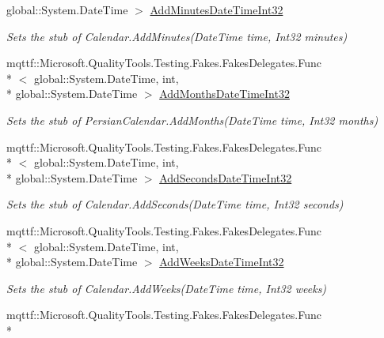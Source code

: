 \begin{DoxyCompactItemize}
global\-::\-System.\-Date\-Time $>$ \hyperlink{class_system_1_1_globalization_1_1_fakes_1_1_stub_persian_calendar_a5323dc095cebdc40f42385ff7452e242}{Add\-Minutes\-Date\-Time\-Int32}
\begin{DoxyCompactList}\small\item\em Sets the stub of Calendar.\-Add\-Minutes(\-Date\-Time time, Int32 minutes)\end{DoxyCompactList}\item 
mqttf\-::\-Microsoft.\-Quality\-Tools.\-Testing.\-Fakes.\-Fakes\-Delegates.\-Func\\*
$<$ global\-::\-System.\-Date\-Time, int, \\*
global\-::\-System.\-Date\-Time $>$ \hyperlink{class_system_1_1_globalization_1_1_fakes_1_1_stub_persian_calendar_acc43f2b67afd5dc328309eb2699e0e39}{Add\-Months\-Date\-Time\-Int32}
\begin{DoxyCompactList}\small\item\em Sets the stub of Persian\-Calendar.\-Add\-Months(\-Date\-Time time, Int32 months)\end{DoxyCompactList}\item 
mqttf\-::\-Microsoft.\-Quality\-Tools.\-Testing.\-Fakes.\-Fakes\-Delegates.\-Func\\*
$<$ global\-::\-System.\-Date\-Time, int, \\*
global\-::\-System.\-Date\-Time $>$ \hyperlink{class_system_1_1_globalization_1_1_fakes_1_1_stub_persian_calendar_a0bed1c188748a8c81928d253deb8658c}{Add\-Seconds\-Date\-Time\-Int32}
\begin{DoxyCompactList}\small\item\em Sets the stub of Calendar.\-Add\-Seconds(\-Date\-Time time, Int32 seconds)\end{DoxyCompactList}\item 
mqttf\-::\-Microsoft.\-Quality\-Tools.\-Testing.\-Fakes.\-Fakes\-Delegates.\-Func\\*
$<$ global\-::\-System.\-Date\-Time, int, \\*
global\-::\-System.\-Date\-Time $>$ \hyperlink{class_system_1_1_globalization_1_1_fakes_1_1_stub_persian_calendar_a8b0011d7b1efe13a1a5a78e06b477b05}{Add\-Weeks\-Date\-Time\-Int32}
\begin{DoxyCompactList}\small\item\em Sets the stub of Calendar.\-Add\-Weeks(\-Date\-Time time, Int32 weeks)\end{DoxyCompactList}\item 
mqttf\-::\-Microsoft.\-Quality\-Tools.\-Testing.\-Fakes.\-Fakes\-Delegates.\-Func\\*

\end{DoxyCompactItemize}
